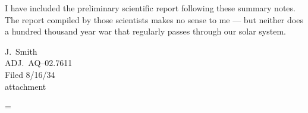 \documentclass[letterpaper,10pt]{texMemo} %
\newenvironment{absolutelynopagebreak}
  {\par\nobreak\vfil\penalty0\vfilneg
   \vtop\bgroup}
  {\par\xdef\tpd{\the\prevdepth}\egroup
   \prevdepth=\tpd}
\begin{document}
\begin{absolutelynopagebreak}
\noindent I have included the preliminary scientific report following these summary notes.  The report compiled by those scientists makes no sense to me --- but neither does a hundred thousand year war that regularly passes through our solar system.

\bigskip
\noindent J.~Smith \\
ADJ.~AQ--02.7611 \\
Filed 8/16/34 \\

\bigskip
\noindent attachment
\end{absolutelynopagebreak}

\end{document}
